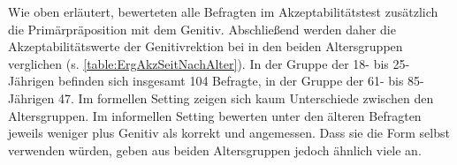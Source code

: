 Wie oben erläutert, bewerteten alle Befragten im Akzeptabilitätstest zusätzlich die Primärpräposition  mit dem Genitiv. 
Abschließend werden daher die Akzeptabilitätswerte der Genitivrektion bei  in den beiden Altersgruppen verglichen (s. \autoref{table:ErgAkzSeitNachAlter}).
In der Gruppe der 18- bis 25-Jährigen befinden sich insgesamt 104 Befragte, in der Gruppe der 61- bis 85-Jährigen 47. 
Im formellen Setting zeigen sich kaum Unterschiede zwischen den Altersgruppen.
Im informellen Setting bewerten unter den älteren Befragten jeweils weniger  plus Genitiv als korrekt und angemessen. 
Dass sie die Form selbst verwenden würden, geben aus beiden Altersgruppen jedoch ähnlich viele an. 
